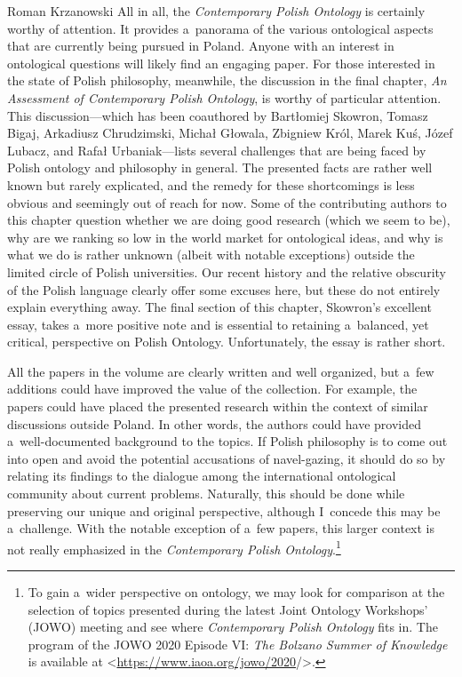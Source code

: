 \begin{recengenv}{Roman Krzanowski}
\enlargethispage{-.5\baselineskip}
All in all, the \textit{Contemporary Polish Ontology} is certainly worthy of attention. It provides a~panorama of the various ontological aspects that are currently being pursued in Poland. Anyone with an interest in ontological questions will likely find an engaging paper. For those interested in the state of Polish philosophy, meanwhile, the discussion in the final chapter, \textit{An Assessment of Contemporary Polish Ontology}, is worthy of particular attention. This discussion—which has been coauthored by Bartłomiej Skowron, Tomasz Bigaj, Arkadiusz Chrudzimski, Michał Głowala, Zbigniew Król, Marek Kuś, Józef Lubacz, and Rafał Urbaniak—lists several challenges that are being faced by Polish ontology and philosophy in general. The presented facts are rather well known but rarely explicated, and the remedy for these shortcomings is less obvious and seemingly out of reach for now. Some of the contributing authors to this chapter question whether we are doing good research (which we seem to be), why are we ranking so low in the world market for ontological ideas, and why is what we do is rather unknown (albeit with notable exceptions) outside the limited circle of Polish universities. Our recent history and the relative obscurity of the Polish language clearly offer some excuses here, but these do not entirely explain everything away. The final section of this chapter, Skowron's excellent essay, takes a~more positive note and is essential to retaining a~balanced, yet critical, perspective on Polish Ontology. Unfortunately, the essay is rather short.

All the papers in the volume are clearly written and well organized, but a~few additions could have improved the value of the collection. For example, the papers could have placed the presented research within the context of similar discussions outside Poland. In other words, the authors could have provided a~well-documented background to the topics. If Polish philosophy is to come out into open and avoid the potential accusations of navel-gazing, it should do so by relating its findings to the dialogue among the international ontological community about current problems. Naturally, this should be done while preserving our unique and original perspective, although I~concede this may be a~challenge. With the notable exception of a~few papers, this larger context is not really emphasized in the \textit{Contemporary Polish Ontology}.\footnote{To gain a~wider perspective on ontology, we may look for comparison at the selection of topics presented during the latest Joint Ontology Workshops' (JOWO) meeting and see where \textit{Contemporary Polish Ontology} fits in. The program of the JOWO 2020 Episode VI: \textit{The Bolzano Summer of Knowledge} is available at {\textless}\url{https://www.iaoa.org/jowo/2020}/{\textgreater}.}


\end{recengenv}
